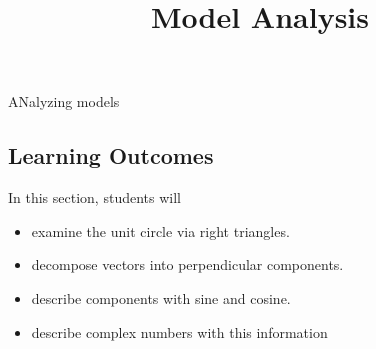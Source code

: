 \documentclass{ximera}
\title{Model Analysis}
\begin{document}
\begin{abstract}
\end{abstract}
\maketitle


ANalyzing models







\subsection{Learning Outcomes}


\begin{sectionOutcomes}
In this section, students will 

\begin{itemize}
\item examine the unit circle via right triangles.
\item decompose vectors into perpendicular components.
\item describe components with sine and cosine.
\item describe complex numbers with this information
\end{itemize}
\end{sectionOutcomes}
\end{document}
